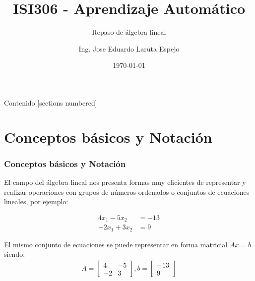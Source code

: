 \documentclass[10pt]{beamer}
\title{ISI306 - Aprendizaje Automático}
\subtitle{Repaso de álgebra lineal}
\date{\today}
\author{Ing. Jose Eduardo Laruta Espejo}
\institute{Universidad La Salle - Bolivia}
\begin{document}
\maketitle

\begin{frame}[allowframebreaks]{Contenido}
  [sections numbered]
  \tableofcontents[]
\end{frame}




\section{Conceptos básicos y Notación}
\begin{frame}
    \frametitle{Conceptos básicos y Notación}
    El campo del álgebra lineal nos presenta formas muy eficientes de 
    representar y realizar operaciones con grupos de números ordenados o conjuntos
    de ecuaciones lineales, por ejemplo:
    
    \begin{align*}
        4x_1 - 5x_2 &= -13 \\
        -2x_1 + 3x_2 &= 9
    \end{align*}

    El mismo conjunto de ecuaciones se puede representar en forma matricial $ Ax = b$ siendo:
    \begin{align*}
        A = \begin{bmatrix}
            4 & -5 \\
            -2 & 3
        \end{bmatrix}
        , 
        b = \begin{bmatrix}
            -13 \\ 
            9
        \end{bmatrix}
    \end{align*}
\end{frame}
\end{document}
